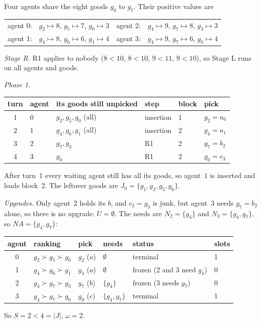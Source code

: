 \documentclass[runningheads,11pt]{llncs}
\newcommand{\NA}{\mathit{NA}}
\begin{document}
\begin{example}[a rotation]\label{ex:rot}
Four agents share the eight goods $g_0$ to $g_7$. Their positive values are
\begin{center}
\setlength{\tabcolsep}{4pt}\begin{tabular}{@{}l@{\ \ }l@{\qquad}l@{\ \ }l@{}}
agent 0: & $g_2\mapsto8$, $g_5\mapsto7$, $g_0\mapsto3$ & agent 2: & $g_4\mapsto9$, $g_7\mapsto8$, $g_3\mapsto3$ \\
agent 1: & $g_4\mapsto8$, $g_6\mapsto6$, $g_1\mapsto4$ & agent 3: & $g_4\mapsto9$, $g_7\mapsto6$, $g_0\mapsto4$ \\
\end{tabular}
\end{center}
\emph{Stage R.} R1 applies to nobody ($8<10$, $8<10$, $9<11$, $9<10$), so Stage L runs on all agents and goods.

\emph{Phase 1.}
\begin{center}\small
\setlength{\tabcolsep}{4pt}\begin{tabular}{@{}clllll@{}}
\toprule
turn & agent & its goods still unpicked & step & block & pick \\
\midrule
1 & 0 & $g_2,g_5,g_0$ (all) & insertion & 1 & $g_2=a_0$ \\
2 & 1 & $g_4,g_6,g_1$ (all) & insertion & 2 & $g_4=a_1$ \\
3 & 2 & $g_7,g_3$ & R1 & 2 & $g_7=b_2$ \\
4 & 3 & $g_0$ & R1 & 2 & $g_0=c_3$ \\
\bottomrule
\end{tabular}
\end{center}
After turn~1 every waiting agent still has all its goods, so agent~$1$ is inserted and leads block~2. The leftover goods are $J_0=\{g_1,g_3,g_5,g_6\}$.

\emph{Upgrades.} Only agent~$2$ holds its $b$, and $c_2=g_3$ is junk, but agent~$3$ needs $g_7=b_2$ alone, so there is no upgrade: $U=\emptyset$. The needs are $N_2=\{g_4\}$ and $N_3=\{g_4,g_7\}$, so $\NA=\{g_4,g_7\}$:
\begin{center}\small
\setlength{\tabcolsep}{4pt}\begin{tabular}{@{}clllll@{}}
\toprule
agent & ranking & pick & needs & status & slots \\
\midrule
0 & $g_2\succ g_5\succ g_0$ & $g_2$ ($a$) & $\emptyset$ & terminal & 1 \\
1 & $g_4\succ g_6\succ g_1$ & $g_4$ ($a$) & $\emptyset$ & frozen (2 and 3 need $g_4$) & 0 \\
2 & $g_4\succ g_7\succ g_3$ & $g_7$ ($b$) & $\{g_4\}$ & frozen (3 needs $g_7$) & 0 \\
3 & $g_4\succ g_7\succ g_0$ & $g_0$ ($c$) & $\{g_4,g_7\}$ & terminal & 1 \\
\bottomrule
\end{tabular}
\end{center}
So $S=2<4=|J|$, $\omega=2$.


\end{example}
\end{document}
